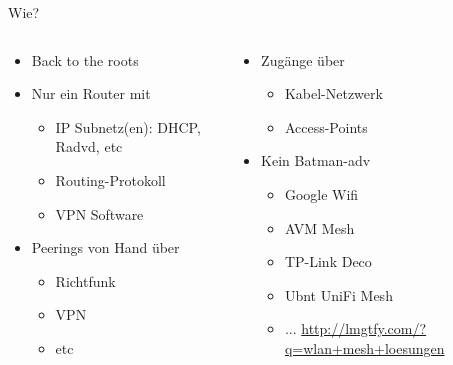 \begin{frame}{Wie?}
    \begin{columns}[T]
        \begin{column}{0.46\textwidth}
            \begin{itemize}
                \item Back to the roots
                \item Nur ein Router mit
                \begin{itemize}
                    \item IP Subnetz(en): DHCP, Radvd, etc
                    \item Routing-Protokoll
                    \item VPN Software
                \end{itemize}
                \item Peerings von Hand über
                \begin{itemize}
                    \item Richtfunk
                    \item VPN
                    \item etc
                \end{itemize}
            \end{itemize}
        \end{column}
        \begin{column}{0.46\textwidth}
            \begin{itemize}
                \item Zugänge über
                \begin{itemize}
                    \item Kabel-Netzwerk
                    \item Access-Points
                \end{itemize}
                \item Kein Batman-adv
                \begin{itemize}
                    \item Google Wifi
                    \item AVM Mesh
                    \item TP-Link Deco
                    \item Ubnt UniFi Mesh
                    \item ... \url{http://lmgtfy.com/?q=wlan+mesh+loesungen}
                \end{itemize}
            \end{itemize}
        \end{column}
    \end{columns}
\end{frame}

